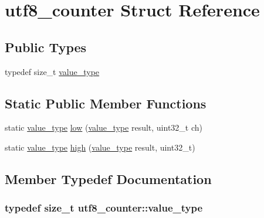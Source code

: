 \hypertarget{structutf8__counter}{\section{utf8\-\_\-counter Struct Reference}
\label{structutf8__counter}
}
\subsection*{Public Types}
\begin{DoxyCompactItemize}
\item 
typedef size\-\_\-t \hyperlink{structutf8__counter_adb65152c007965c42184614da9c4af1b}{value\-\_\-type}
\end{DoxyCompactItemize}
\subsection*{Static Public Member Functions}
\begin{DoxyCompactItemize}
\item 
static \hyperlink{structutf8__counter_adb65152c007965c42184614da9c4af1b}{value\-\_\-type} \hyperlink{structutf8__counter_a0950643189089175ae0eac9b4193534d}{low} (\hyperlink{structutf8__counter_adb65152c007965c42184614da9c4af1b}{value\-\_\-type} result, uint32\-\_\-t ch)
\item 
static \hyperlink{structutf8__counter_adb65152c007965c42184614da9c4af1b}{value\-\_\-type} \hyperlink{structutf8__counter_ab16e675980a15e1ede2e4cd18d19f7b1}{high} (\hyperlink{structutf8__counter_adb65152c007965c42184614da9c4af1b}{value\-\_\-type} result, uint32\-\_\-t)
\end{DoxyCompactItemize}


\subsection{Member Typedef Documentation}
\hypertarget{structutf8__counter_adb65152c007965c42184614da9c4af1b}{
\subsubsection[{value\-\_\-type}]{\setlength{\rightskip}{0pt plus 5cm}typedef size\-\_\-t {\bf utf8\-\_\-counter\-::value\-\_\-type}}}\label{structutf8__counter_adb65152c007965c42184614da9c4af1b}


